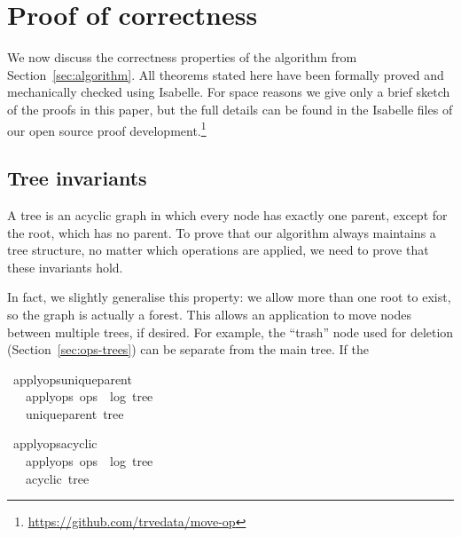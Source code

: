 \documentclass[sigconf]{acmart}
\renewenvironment{isabelle}{%
  \bigbreak\noindent%
  \renewcommand{\isanewline}{\\}%
  \begin{minipage}{\columnwidth}%
  \begin{isabellebody}%
  \begin{tabbing}%
}{%
  \end{tabbing}%
  \end{isabellebody}%
  \end{minipage}%
  \bigbreak%
}
\renewcommand{\isacartoucheopen}{}
\renewcommand{\isacartoucheclose}{}
\begin{document}

\section{Proof of correctness}\label{sec:proof}

We now discuss the correctness properties of the algorithm from Section~\ref{sec:algorithm}.
All theorems stated here have been formally proved and mechanically checked using Isabelle.
For space reasons we give only a brief sketch of the proofs in this paper, but the full details can be found in the Isabelle files of our open source proof development.\footnote{\url{https://github.com/trvedata/move-op}}

\subsection{Tree invariants}\label{sec:tree-invariants}

A tree is an acyclic graph in which every node has exactly one parent, except for the root, which has no parent.
To prove that our algorithm always maintains a tree structure, no matter which operations are applied, we need to prove that these invariants hold.

In fact, we slightly generalise this property: we allow more than one root to exist, so the graph is actually a forest.
This allows an application to move nodes between multiple trees, if desired.
For example, the ``trash'' node used for deletion (Section~\ref{sec:ops-trees}) can be separate from the main tree.
If the 

\begin{isabelle}
\isamarkupfalse%
\ apply{\isacharunderscore}ops{\isacharunderscore}unique{\isacharunderscore}parent{\isacharcolon}\isanewline
\ \ \ {\isacartoucheopen}apply{\isacharunderscore}ops\ ops\ {\isacharequal}\ {\isacharparenleft}log{\isacharcomma}\ tree{\isacharparenright}{\isacartoucheclose}\isanewline
\ \ \ {\isacartoucheopen}unique{\isacharunderscore}parent\ tree{\isacartoucheclose}
\end{isabelle}

\begin{isabelle}
\isamarkupfalse%
\ apply{\isacharunderscore}ops{\isacharunderscore}acyclic{\isacharcolon}\isanewline
\ \ \ {\isacartoucheopen}apply{\isacharunderscore}ops\ ops\ {\isacharequal}\ {\isacharparenleft}log{\isacharcomma}\ tree{\isacharparenright}{\isacartoucheclose}\isanewline
\ \ \ {\isacartoucheopen}acyclic\ tree{\isacartoucheclose}
\end{isabelle}
\end{document}
